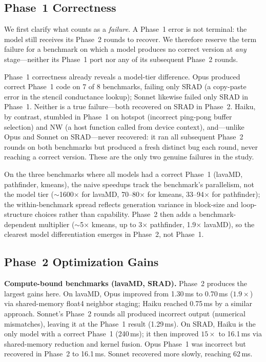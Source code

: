 \documentclass[conference]{IEEEtran}
\begin{document}
\subsection{Phase~1 Correctness}

We first clarify what counts as a \emph{failure}. A Phase~1 error is not
terminal: the model still receives its Phase~2 rounds to recover. We therefore
reserve the term failure for a benchmark on which a model produces no correct
version at \emph{any} stage---neither its Phase~1 port nor any of its subsequent
Phase~2 rounds.

Phase~1 correctness already reveals a model-tier difference. Opus produced
correct Phase~1 code on 7 of 8 benchmarks, failing only SRAD (a copy-paste
error in the stencil conductance lookup); Sonnet likewise failed only SRAD in
Phase~1. Neither is a true failure---both recovered on SRAD in Phase~2. Haiku,
by contrast, stumbled in Phase~1 on hotspot (incorrect ping-pong buffer
selection) and NW (a host function called from device context), and---unlike
Opus and Sonnet on SRAD---never recovered: it ran all subsequent Phase~2 rounds
on both benchmarks but produced a fresh distinct bug each round, never reaching
a correct version. These are the only two genuine failures in the study.

On the three benchmarks where all models had a correct Phase~1 (lavaMD,
pathfinder, kmeans), the naive speedups track the benchmark's parallelism, not
the model tier ($\sim$1600$\times$ for lavaMD, 70--80$\times$ for kmeans,
33--94$\times$ for pathfinder); the within-benchmark spread reflects generation
variance in block-size and loop-structure choices rather than capability.
Phase~2 then adds a benchmark-dependent multiplier ($\sim$5$\times$ kmeans,
up to 3$\times$ pathfinder, 1.9$\times$ lavaMD), so the clearest model
differentiation emerges in Phase~2, not Phase~1.

\subsection{Phase~2 Optimization Gains}

\textbf{Compute-bound benchmarks (lavaMD, SRAD).}
Phase~2 produces the largest gains here. On lavaMD, Opus improved from
1.30\,ms to 0.70\,ms ($1.9\times$) via shared-memory float4 neighbor staging;
Haiku reached 0.75\,ms by a similar approach. Sonnet's Phase~2 rounds all
produced incorrect output (numerical mismatches), leaving it at the Phase~1
result (1.29\,ms).
On SRAD, Haiku is the only model with a correct Phase~1 (240\,ms); it then
improved $15\times$ to 16.1\,ms via shared-memory reduction and kernel fusion.
Opus Phase~1 was incorrect but recovered in Phase~2 to 16.1\,ms. Sonnet
recovered more slowly, reaching 62\,ms.
\end{document}

